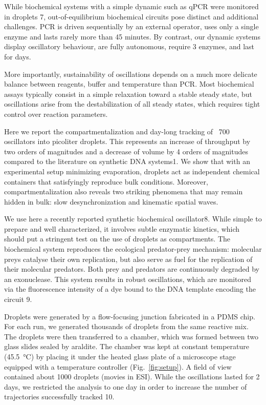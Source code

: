 \documentclass[prl,reprint, amsmath,amssymb,superscriptaddress]{revtex4-1}
\begin{document}
 	While biochemical systems with a simple dynamic such as qPCR were monitored in droplets 7, out-of-equilibrium biochemical circuits pose distinct and additional challenges. PCR is driven sequentially by an external operator, uses only a single enzyme and lasts rarely more than 45 minutes. By contrast, our dynamic systems display oscillatory behaviour, are fully autonomous, require 3 enzymes, and last for days.
 	
	More importantly, sustainability of oscillations depends on a much more delicate balance between reagents, buffer and temperature than PCR. Most biochemical assays typically consist in a simple relaxation toward a stable steady state, but oscillations arise from the destabilization of all steady states, which requires tight control over reaction parameters. 
	
	Here we report the compartmentalization and day-long tracking of ~700 oscillators into picoliter droplets. This represents an increase of throughput by two orders of magnitudes and a decrease of volume by 4 orders of magnitudes compared to the literature on synthetic DNA systems1. We show that with an experimental setup minimizing evaporation, droplets act as independent chemical containers that satisfyingly reproduce bulk conditions. Moreover, compartmentalization also reveals two striking phenomena that may remain hidden in bulk: slow desynchronization and kinematic spatial waves. 
	
	We use here a recently reported synthetic biochemical oscillator8. While simple to prepare and well characterized, it involves subtle enzymatic kinetics, which should put a stringent test on the use of droplets as compartments. The biochemical system reproduces the ecological predator-prey mechanism: molecular preys catalyse their own replication, but also serve as fuel for the replication of their molecular predators. Both prey and predators are continuously degraded by an exonuclease. This system results in robust oscillations, which are monitored via the fluorescence intensity of a dye bound to the DNA template encoding the circuit 9.
	
	Droplets were generated by a flow-focusing junction fabricated in a PDMS chip. For each run, we generated thousands of droplets from the same reactive mix. The droplets were then transferred to a chamber, which was formed between two glass slides sealed by araldite. The chamber was kept at constant temperature (\SI{45.5}{\celsius}) by placing it under the heated glass plate of a microscope stage equipped with a temperature controller (Fig.~\ref{fig:setup}). A field of view contained about 1000 droplets (movies in ESI). While the oscillations lasted for 2 days, we restricted the analysis to one day in order to increase the number of trajectories successfully tracked 10.
\end{document}
